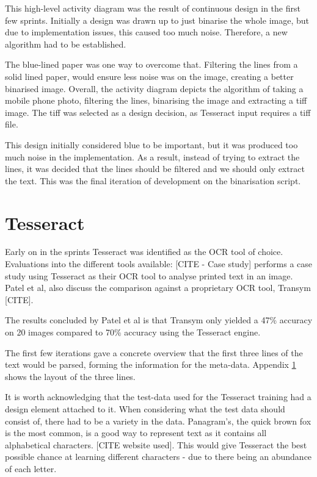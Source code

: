 This high-level activity diagram was the result of continuous design in the first few sprints. Initially a design was drawn up to just binarise the whole image, but due to implementation issues, this caused too much noise. Therefore, a new algorithm had to be established.

The blue-lined paper was one way to overcome that. Filtering the lines from a solid lined paper, would ensure less noise was on the image, creating a better binarised image. Overall, the activity diagram depicts the algorithm of taking a mobile phone photo, filtering the lines, binarising the image and extracting a tiff image. The tiff was selected as a design decision, as Tesseract input requires a tiff file.

This design initially considered blue to be important, but it was produced too much noise in the implementation. As a result, instead of trying to extract the lines, it was decided that the lines should be filtered and we should only extract the text. This was the final iteration of development on the binarisation script.

\section{Tesseract}
Early on in the sprints Tesseract was identified as the OCR tool of choice. Evaluations into the different tools available: [CITE - Case study] performs a case study using Tesseract as their OCR tool to analyse printed text in an image. Patel et al, also discuss the comparison against a proprietary OCR tool, Transym [CITE].

The results concluded by Patel et al is that Transym only yielded a 47\% accuracy on 20 images compared to 70\% accuracy using the Tesseract engine.

The first few iterations gave a concrete overview that the first three lines of the text would be parsed, forming the information for the meta-data. Appendix \ref{} shows the layout of the three lines.

It is worth acknowledging that the test-data used for the Tesseract training had a design element attached to it. When considering what the test data should consist of, there had to be a variety in the data. Panagram's, the quick brown fox is the most common, is a good way to represent text as it contains all alphabetical characters. [CITE website used]. This would give Tesseract the best possible chance at learning different characters - due to there being an abundance of each letter.

